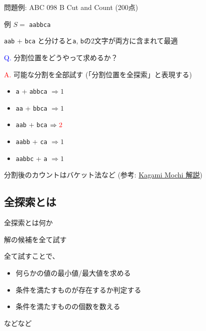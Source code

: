 \documentclass[dvipdfmx]{beamer}
\begin{document}
\begin{frame}{問題例: ABC 098 B Cut and Count (200点)}
  \begin{block}{例}
    $S =$ \Verb|aabbca|
    \pause

    \Verb|aab| + \Verb|bca| と分けると\Verb|a|, \Verb|b|の2文字が両方に含まれて最適
    \pause

    \textcolor{blue}{Q.} 分割位置をどうやって求めるか？
    \pause

    \textcolor{red}{A.} 可能な分割を全部試す (「分割位置を全探索」と表現する)
    \begin{itemize}
      \item \Verb|a| + \Verb|abbca| \hspace{2em} $\Rightarrow 1$
      \item \Verb|aa| + \Verb|bbca| \hspace{2em} $\Rightarrow 1$
      \item \Verb|aab| + \Verb|bca| \hspace{2em} $\Rightarrow \textcolor{red}{2}$
      \item \Verb|aabb| + \Verb|ca| \hspace{2em} $\Rightarrow 1$
      \item \Verb|aabbc| + \Verb|a| \hspace{2em} $\Rightarrow 1$
    \end{itemize}
  \end{block}
  分割後のカウントはバケット法など
  (参考: \href{https://qiita.com/drken/items/fd4e5e3630d0f5859067\#\%E7\%AC\%AC-7-\%E5\%95\%8F--abc-085-b---kagami-mochi-200-\%E7\%82\%B9}{Kagami Mochi 解説})
\end{frame}

\subsection{全探索とは}

\begin{frame}{全探索とは何か}
  \begin{block}{}
    \centering
    {\Huge 解の候補を全て試す}
  \end{block}
  \begin{block}{}
    全て試すことで、
    \begin{itemize}
      \item 何らかの値の最小値/最大値を求める
      \item 条件を満たすものが存在するか判定する
      \item 条件を満たすものの個数を数える
    \end{itemize}
    などなど
  \end{block}
\end{frame}
\end{document}
